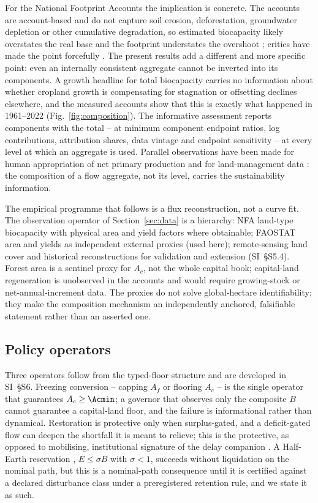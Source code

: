 For the National Footprint Accounts the implication is concrete. The accounts are account-based and do not capture soil erosion, deforestation, groundwater depletion or other cumulative degradation, so estimated biocapacity likely overstates the real base and the footprint understates the overshoot \citep{Wackernagel2002,Borucke2013}; critics have made the point forcefully \citep{Blomqvist2013,GiampietroSaltelli2014,Galli2016,vdBerghGrazi2015}. The present results add a different and more specific point: even an internally consistent aggregate cannot be inverted into its components. A growth headline for total biocapacity carries no information about whether cropland growth is compensating for stagnation or offsetting declines elsewhere, and the measured accounts show that this is exactly what happened in 1961--2022 (Fig.~\ref{fig:composition}). The informative assessment reports components with the total -- at minimum component endpoint ratios, log contributions, attribution shares, data vintage and endpoint sensitivity -- at every level at which an aggregate is used. Parallel observations have been made for human appropriation of net primary production and for land-management data \citep{Haberl2007,Krausmann2013,Erb2017,Carvalhais2014}: the composition of a flow aggregate, not its level, carries the sustainability information.

The empirical programme that follows is a flux reconstruction, not a curve fit. The observation operator of Section~\ref{sec:data} is a hierarchy: NFA land-type biocapacity with physical area and yield factors where obtainable; FAOSTAT area and yields as independent external proxies (used here); remote-sensing land cover and historical reconstructions for validation and extension (SI~\S S5.4). Forest area is a sentinel proxy for $A_c$, not the whole capital book; capital-land regeneration is unobserved in the accounts and would require growing-stock or net-annual-increment data. The proxies do not solve global-hectare identifiability; they make the composition mechanism an independently anchored, falsifiable statement rather than an asserted one.

\subsection{Policy operators}

Three operators follow from the typed-floor structure and are developed in SI~\S S6. Freezing conversion -- capping $A_f$ or flooring $A_c$ -- is the single operator that guarantees $A_c\ge\Acmin$; a governor that observes only the composite $B$ cannot guarantee a capital-land floor, and the failure is informational rather than dynamical. Restoration is protective only when surplus-gated, and a deficit-gated flow can deepen the shortfall it is meant to relieve; this is the protective, as opposed to mobilising, institutional signature of the delay companion \citep{Abaee2026a}. A Half-Earth reservation \citep{Wilson2016}, $E\le\sigma B$ with $\sigma<1$, succeeds without liquidation on the nominal path, but this is a nominal-path consequence until it is certified against a declared disturbance class under a preregistered retention rule, and we state it as such.

